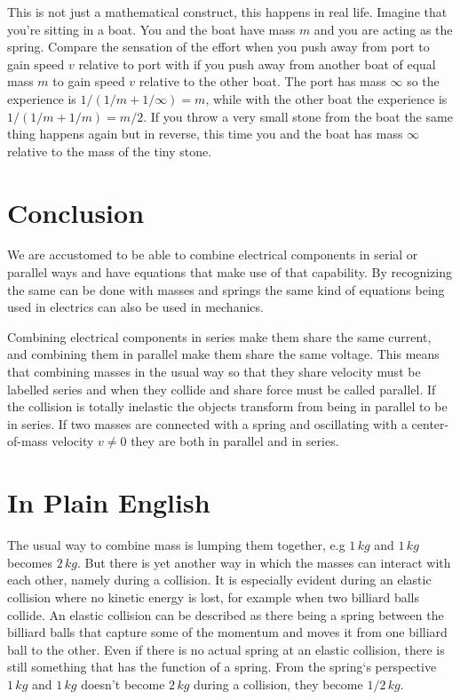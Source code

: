 \documentclass[]{../common/elementary-physics}
\begin{document}
This is not just a mathematical construct, this happens in real life.
Imagine that you're sitting in a boat.
You and the boat have mass $m$ and you are acting as the spring.
Compare the sensation of the effort when you push away from port to gain speed $v$ relative to port with if you push away from another boat of equal mass $m$ to gain speed $v$ relative to the other boat.
The port has mass $\infty$ so the experience is $1/(1/m + 1/\infty) = m$, while with the other boat the experience is $1/(1/m + 1/m) = m/2$.
If you throw a very small stone from the boat the same thing happens again but in reverse, this time you and the boat has mass $\infty$ relative to the mass of the tiny stone.

\section{Conclusion}

We are accustomed to be able to combine electrical components in serial or parallel ways and have equations that make use of that capability.
By recognizing the same can be done with masses and springs the same kind of equations being used in electrics can also be used in mechanics.

Combining electrical components in series make them share the same current, and combining them in parallel make them share the same voltage.
This means that combining masses in the usual way so that they share velocity must be labelled series and when they collide and share force must be called parallel.
If the collision is totally inelastic the objects transform from being in parallel to be in series.
If two masses are connected with a spring and oscillating with a center-of-mass velocity $v \neq 0$ they are both in parallel and in series.

\appendix

\section{In Plain English}

The usual way to combine mass is lumping them together, e.g $1 \, kg$ and $1 \, kg$ becomes $2 \, kg$.
But there is yet another way in which the masses can interact with each other, namely during a collision.
It is especially evident during an elastic collision where no kinetic energy is lost, for example when two billiard balls collide.
An elastic collision can be described as there being a spring between the billiard balls that capture some of the momentum and moves it from one billiard ball to the other.
Even if there is no actual spring at an elastic collision, there is still something that has the function of a spring.
From the spring`s perspective $1 \, kg$ and $1 \, kg$ doesn’t become $2 \, kg$ during a collision, they become $1/2 \, kg$.
\end{document}
